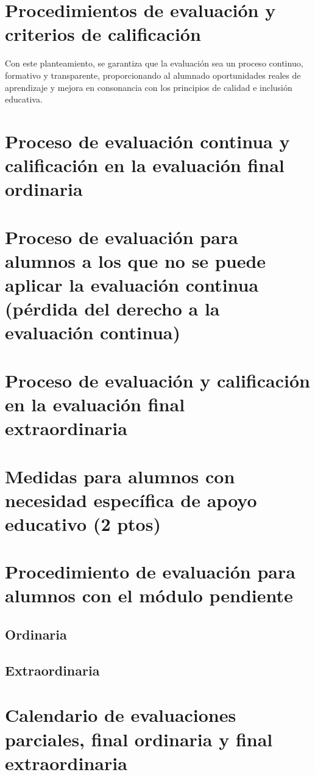 \section{Procedimientos de evaluación y criterios de calificación}







Con este planteamiento, se garantiza que la evaluación sea un proceso continuo, formativo y transparente, proporcionando al alumnado oportunidades reales de aprendizaje y mejora en consonancia con los principios de calidad e inclusión educativa.


	\section{Proceso de evaluación continua y calificación en la evaluación final ordinaria}

	\section{Proceso de evaluación para alumnos a los que no se puede aplicar la evaluación continua (pérdida del derecho a la evaluación continua)}



	\section{Proceso de evaluación y calificación en la evaluación final extraordinaria}
	\section{Medidas para alumnos con necesidad específica de apoyo educativo (2 ptos)}
	\section{Procedimiento de evaluación para alumnos con el módulo pendiente}

	\subsection{Ordinaria}
	\subsection{Extraordinaria}
	\section{Calendario de evaluaciones parciales, final ordinaria y final extraordinaria}
